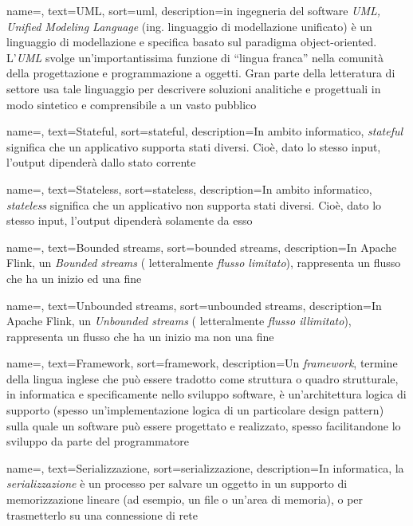 {
    name=,
    text=UML,
    sort=uml,
    description={in ingegneria del software \emph{UML, Unified Modeling Language} (ing. linguaggio di modellazione unificato) è un linguaggio di modellazione e specifica basato sul paradigma object-oriented. L'\emph{UML} svolge un'importantissima funzione di ``lingua franca'' nella comunità della progettazione e programmazione a oggetti. Gran parte della letteratura di settore usa tale linguaggio per descrivere soluzioni analitiche e progettuali in modo sintetico e comprensibile a un vasto pubblico}
}

{
    name=,
    text=Stateful,
    sort=stateful,
    description={In ambito informatico, \emph{stateful} significa che un applicativo supporta stati diversi. Cioè, dato lo stesso input, l'output dipenderà dallo stato corrente}
}

{
    name=,
    text=Stateless,
    sort=stateless,
    description={In ambito informatico, \emph{stateless} significa che un applicativo non supporta stati diversi. Cioè, dato lo stesso input, l'output dipenderà solamente da esso}
}

{
    name=,
    text=Bounded streams,
    sort=bounded streams,
    description={In Apache Flink, un \textit{Bounded streams} ( letteralmente \textit{flusso limitato}), rappresenta un flusso che ha un inizio ed una fine}
}

{
    name=,
    text=Unbounded streams,
    sort=unbounded streams,
    description={In Apache Flink, un \textit{Unbounded streams} ( letteralmente \textit{flusso illimitato}), rappresenta un flusso che ha un inizio ma non una fine}
}

{
    name=,
    text=Framework,
    sort=framework,
    description={Un \textit{framework}, termine della lingua inglese che può essere tradotto come struttura o quadro strutturale, in informatica e specificamente nello sviluppo software, è un'architettura logica di supporto (spesso un'implementazione logica di un particolare design pattern) sulla quale un software può essere progettato e realizzato, spesso facilitandone lo sviluppo da parte del programmatore}
}


{
    name=,
    text=Serializzazione,
    sort=serializzazione,
    description={In informatica, la \textit{serializzazione} è un processo per salvare un oggetto in un supporto di memorizzazione lineare (ad esempio, un file o un'area di memoria), o per trasmetterlo su una connessione di rete}
}

